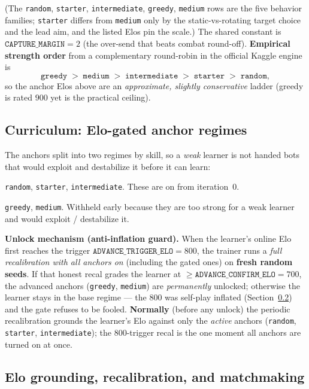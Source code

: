 \documentclass[11pt]{article}
\begin{document}
\noindent (The \texttt{random}, \texttt{starter}, \texttt{intermediate}, \texttt{greedy}, \texttt{medium}
rows are the five behavior families; \texttt{starter} differs from \texttt{medium} only by the
static-vs-rotating target choice and the lead aim, and the listed Elos pin the scale.) The shared
constant is $\texttt{CAPTURE\_MARGIN}=2$ (the over-send that beats combat round-off).
\textbf{Empirical strength order} from a complementary round-robin in the official Kaggle engine is
\[
\texttt{greedy} \;>\; \texttt{medium} \;>\; \texttt{intermediate} \;>\; \texttt{starter} \;>\; \texttt{random},
\]
so the anchor Elos above are an \emph{approximate, slightly conservative} ladder (greedy is rated $900$
yet is the practical ceiling).

\subsection{Curriculum: Elo-gated anchor regimes}\label{sec:gatedcurriculum}
The anchors split into two regimes by skill, so a \emph{weak} learner is not handed bots that would
exploit and destabilize it before it can learn:
\begin{description}[nosep,leftmargin=1.4em]
\item[Base regime (always-active anchors):] \texttt{random}, \texttt{starter}, \texttt{intermediate}.
  These are on from iteration~0.
\item[Advanced regime (gated anchors):] \texttt{greedy}, \texttt{medium}. Withheld early because they
  are too strong for a weak learner and would exploit / destabilize it.
\end{description}
\textbf{Unlock mechanism (anti-inflation guard).} When the learner's online Elo first reaches the
trigger $\texttt{ADVANCE\_TRIGGER\_ELO}=800$, the trainer runs a \emph{full recalibration with all anchors on}
(including the gated ones) on \textbf{fresh random seeds}. If that honest recal grades the learner
at $\ge\texttt{ADVANCE\_CONFIRM\_ELO}=700$, the advanced anchors (\texttt{greedy}, \texttt{medium})
are \emph{permanently} unlocked; otherwise the learner stays in the base regime --- the $800$ was self-play
inflated (Section~\ref{sec:eloRecal}) and the gate refuses to be fooled. \textbf{Normally} (before any
unlock) the periodic recalibration grounds the learner's Elo against only the \emph{active} anchors
(\texttt{random}, \texttt{starter}, \texttt{intermediate}); the $800$-trigger recal is the one moment
all anchors are turned on at once.

\subsection{Elo grounding, recalibration, and matchmaking}\label{sec:eloRecal}
\end{document}
